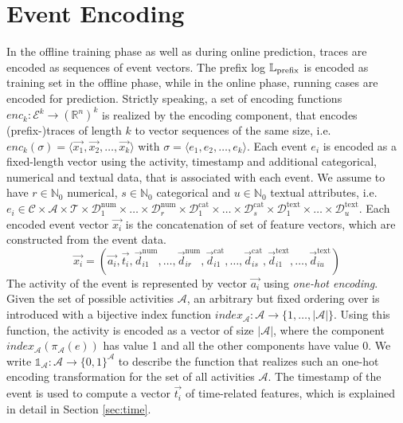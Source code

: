 \section{Event Encoding}

In the offline training phase as well as during online prediction, traces are encoded as sequences of event vectors.
The prefix log $\mathbb{L}_\mathrm{prefix}$ is encoded as training set in the offline phase, while in the online phase, running cases are encoded for prediction.
Strictly speaking, a set of encoding functions  $enc_k \colon \mathcal{E}^k \to (\mathbb{R}^n)^k$ is realized by the encoding component, that encodes (prefix-)traces of length $k$ to vector sequences of the same size, i.e. $enc_k(\sigma) = \langle \vec{x_1}, \vec{x_2}, \dots, \vec{x_k}\rangle$ with $\sigma = \langle e_1, e_2, \dots, e_k\rangle$.
Each event $e_i$ is encoded as a fixed-length vector using the activity, timestamp and additional categorical, numerical and textual data, that is associated with each event.
We assume to have $r \in \mathbb{N}_0$ numerical, $s \in \mathbb{N}_0$ categorical and $u \in \mathbb{N}_0$ textual attributes, i.e. $e_i \in \mathcal{C} \times \mathcal{A}  \times \mathcal{T} \times \mathcal{D}_1^\mathrm{num} \times \dots \times \mathcal{D}_r^\mathrm{num}   \times \mathcal{D}_1^\mathrm{cat}  \times  \dots  \times \mathcal{D}_s^\mathrm{cat}   \times \mathcal{D}_1^\mathrm{text}   \times \dots  \times \mathcal{D}_u^\mathrm{text}$.
Each encoded event vector $\vec{x_i}$ is the concatenation of set of feature vectors, which are constructed from the event data.
\begin{equation*}
\vec{x_i}=(
\vec{a_i},
\vec{t_i},
\vec{d}_{i1}^\mathrm{num}, \dots,\vec{d}_{ir}^\mathrm{num},
\vec{d}_{i1}^\mathrm{cat}, \dots,\vec{d}_{is}^\mathrm{cat},
\vec{d}_{i1}^\mathrm{text}, \dots, \vec{d}_{iu}^\mathrm{text})
\end{equation*}
The activity of the event is represented by vector $\vec{a_i}$ using \textit{one-hot encoding}.
Given the set of possible activities $\mathcal{A}$, an arbitrary but fixed ordering over is introduced with a bijective index function $index_\mathcal{A} \colon \mathcal{A} \to \{1, \dots, |\mathcal{A}|\}$.
Using this function, the activity is encoded as a vector of size $|\mathcal{A}|$, where the component $index_\mathcal{A}(\pi_\mathcal{A}(e))$ has value 1 and all the other components have value 0.
We write $\mathds{1}_\mathcal{A}\colon \mathcal{A} \to \{0,1\}^\mathcal{A}$ to describe the function that realizes such an one-hot encoding transformation for the set of all activities $\mathcal{A}$.
The timestamp of the event is used to compute a vector $\vec{t_i}$ of time-related features, which is explained in detail in Section \ref*{sec:time}.

